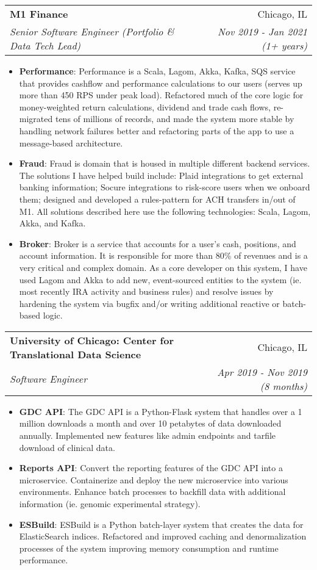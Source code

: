 \documentclass[letterpaper,11pt]{article}
\makeatletter
\newcommand{\resumeItem}[2]{
  \item\small{
    \textbf{#1}{: #2 \vspace{-2pt}}
  }
}
\newcommand{\resumeSubheading}[4]{
  \vspace{-1pt}\item
    \begin{tabular*}{0.97\textwidth}[t]{l@{\extracolsep{\fill}}r}
      \textbf{#1} & #2 \\
      \textit{\small#3} & \textit{\small #4} \\
    \end{tabular*}\vspace{-5pt}
}
\newcommand{\resumeItemListStart}{\begin{itemize}}
\newcommand{\resumeItemListEnd}{\end{itemize}\vspace{-5pt}}
\makeatother
\begin{document}
    \resumeSubheading
      {M1 Finance}{Chicago, IL}
      {Senior Software Engineer (Portfolio \& Data Tech Lead)}{Nov 2019 - Jan 2021 (1+ years)}
      \resumeItemListStart
        \resumeItem{Performance}
          {Performance is a Scala, Lagom, Akka, Kafka, SQS service that provides cashflow and performance calculations to our users (serves up more than 450 RPS under peak load). Refactored much of the core logic for money-weighted return calculations, dividend and trade cash flows, re-migrated tens of millions of records, and made the system more stable by handling network failures better and refactoring parts of the app to use a message-based architecture.}
        \resumeItem{Fraud}
          {Fraud is domain that is housed in multiple different backend services. The solutions I have helped build include: Plaid integrations to get external banking information; Socure integrations to risk-score users when we onboard them; designed and developed a rules-pattern for ACH transfers in/out of M1. All solutions described here use the following technologies: Scala, Lagom, Akka, and Kafka.}
        \resumeItem{Broker}
          {Broker is a service that accounts for a user's cash, positions, and account information. It is responsible for more than 80\% of revenues and is a very critical and complex domain. As a core developer on this system, I have used Lagom and Akka to add new, event-sourced entities to the system (ie. most recently IRA activity and business rules) and resolve issues by hardening the system via bugfix and/or writing additional reactive or batch-based logic.}
      \resumeItemListEnd

    \resumeSubheading
      {University of Chicago: Center for Translational Data Science}{Chicago, IL}
      {Software Engineer}{Apr 2019 - Nov 2019 (8 months)}
      \resumeItemListStart
        \resumeItem{GDC API}
          {The GDC API is a Python-Flask system that handles over a 1 million downloads a month and over 10 petabytes of data downloaded annually. Implemented new features like admin endpoints and tarfile download of clinical data.}
        \resumeItem{Reports API}
          {Convert the reporting features of the GDC API into a microservice. Containerize and deploy the new microservice into various environments. Enhance batch processes to backfill data with additional information (ie. genomic experimental strategy).}
        \resumeItem{ESBuild}
          {ESBuild is a Python batch-layer system that creates the data for ElasticSearch indices. Refactored and improved caching and denormalization processes of the system improving memory consumption and runtime performance.}
      \resumeItemListEnd
\end{document}
